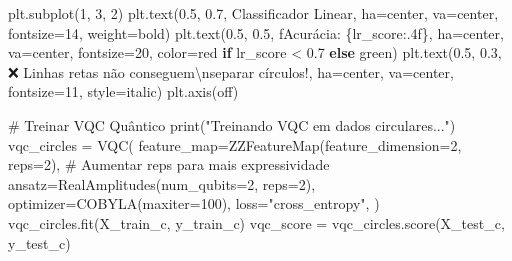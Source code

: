 \documentclass[
  brazilian,
]{report}
\newenvironment{Shaded}{\begin{snugshade}}{\end{snugshade}}
\newcommand{\BuiltInTok}[1]{\textcolor[rgb]{0.00,0.23,0.31}{#1}}
\newcommand{\CharTok}[1]{\textcolor[rgb]{0.13,0.47,0.30}{#1}}
\newcommand{\CommentTok}[1]{\textcolor[rgb]{0.37,0.37,0.37}{#1}}
\newcommand{\ControlFlowTok}[1]{\textcolor[rgb]{0.00,0.23,0.31}{\textbf{#1}}}
\newcommand{\DecValTok}[1]{\textcolor[rgb]{0.68,0.00,0.00}{#1}}
\newcommand{\FloatTok}[1]{\textcolor[rgb]{0.68,0.00,0.00}{#1}}
\newcommand{\NormalTok}[1]{\textcolor[rgb]{0.00,0.23,0.31}{#1}}
\newcommand{\OperatorTok}[1]{\textcolor[rgb]{0.37,0.37,0.37}{#1}}
\newcommand{\SpecialCharTok}[1]{\textcolor[rgb]{0.37,0.37,0.37}{#1}}
\newcommand{\SpecialStringTok}[1]{\textcolor[rgb]{0.13,0.47,0.30}{#1}}
\newcommand{\StringTok}[1]{\textcolor[rgb]{0.13,0.47,0.30}{#1}}
\begin{document}
\begin{tcolorbox}
\begin{Shaded}
\begin{Highlighting}[]
\NormalTok{plt.subplot(}\DecValTok{1}\NormalTok{, }\DecValTok{3}\NormalTok{, }\DecValTok{2}\NormalTok{)}
\NormalTok{plt.text(}\FloatTok{0.5}\NormalTok{, }\FloatTok{0.7}\NormalTok{, }\StringTok{\textquotesingle{}Classificador Linear\textquotesingle{}}\NormalTok{, ha}\OperatorTok{=}\StringTok{\textquotesingle{}center\textquotesingle{}}\NormalTok{, va}\OperatorTok{=}\StringTok{\textquotesingle{}center\textquotesingle{}}\NormalTok{, }
\NormalTok{         fontsize}\OperatorTok{=}\DecValTok{14}\NormalTok{, weight}\OperatorTok{=}\StringTok{\textquotesingle{}bold\textquotesingle{}}\NormalTok{)}
\NormalTok{plt.text(}\FloatTok{0.5}\NormalTok{, }\FloatTok{0.5}\NormalTok{, }\SpecialStringTok{f\textquotesingle{}Acurácia: }\SpecialCharTok{\{}\NormalTok{lr\_score}\SpecialCharTok{:.4f\}}\SpecialStringTok{\textquotesingle{}}\NormalTok{, ha}\OperatorTok{=}\StringTok{\textquotesingle{}center\textquotesingle{}}\NormalTok{, va}\OperatorTok{=}\StringTok{\textquotesingle{}center\textquotesingle{}}\NormalTok{, }
\NormalTok{         fontsize}\OperatorTok{=}\DecValTok{20}\NormalTok{, color}\OperatorTok{=}\StringTok{\textquotesingle{}red\textquotesingle{}} \ControlFlowTok{if}\NormalTok{ lr\_score }\OperatorTok{\textless{}} \FloatTok{0.7} \ControlFlowTok{else} \StringTok{\textquotesingle{}green\textquotesingle{}}\NormalTok{)}
\NormalTok{plt.text(}\FloatTok{0.5}\NormalTok{, }\FloatTok{0.3}\NormalTok{, }\StringTok{\textquotesingle{}❌ Linhas retas não conseguem}\CharTok{\textbackslash{}n}\StringTok{separar círculos!\textquotesingle{}}\NormalTok{, }
\NormalTok{         ha}\OperatorTok{=}\StringTok{\textquotesingle{}center\textquotesingle{}}\NormalTok{, va}\OperatorTok{=}\StringTok{\textquotesingle{}center\textquotesingle{}}\NormalTok{, fontsize}\OperatorTok{=}\DecValTok{11}\NormalTok{, style}\OperatorTok{=}\StringTok{\textquotesingle{}italic\textquotesingle{}}\NormalTok{)}
\NormalTok{plt.axis(}\StringTok{\textquotesingle{}off\textquotesingle{}}\NormalTok{)}

\CommentTok{\# Treinar VQC Quântico}
\BuiltInTok{print}\NormalTok{(}\StringTok{"Treinando VQC em dados circulares..."}\NormalTok{)}
\NormalTok{vqc\_circles }\OperatorTok{=}\NormalTok{ VQC(}
\NormalTok{    feature\_map}\OperatorTok{=}\NormalTok{ZZFeatureMap(feature\_dimension}\OperatorTok{=}\DecValTok{2}\NormalTok{, reps}\OperatorTok{=}\DecValTok{2}\NormalTok{),  }\CommentTok{\# Aumentar reps para mais expressividade}
\NormalTok{    ansatz}\OperatorTok{=}\NormalTok{RealAmplitudes(num\_qubits}\OperatorTok{=}\DecValTok{2}\NormalTok{, reps}\OperatorTok{=}\DecValTok{2}\NormalTok{),}
\NormalTok{    optimizer}\OperatorTok{=}\NormalTok{COBYLA(maxiter}\OperatorTok{=}\DecValTok{100}\NormalTok{),}
\NormalTok{    loss}\OperatorTok{=}\StringTok{"cross\_entropy"}\NormalTok{,}
\NormalTok{)}
\NormalTok{vqc\_circles.fit(X\_train\_c, y\_train\_c)}
\NormalTok{vqc\_score }\OperatorTok{=}\NormalTok{ vqc\_circles.score(X\_test\_c, y\_test\_c)}


\end{Highlighting}
\end{Shaded}
\end{tcolorbox}
\end{document}
